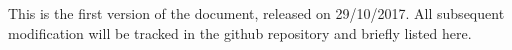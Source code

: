 This is the first version of the document, released on 29/10/2017.
All subsequent modification will be tracked in the github repository and briefly listed here.